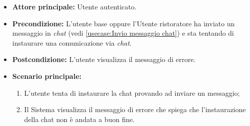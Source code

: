 \label{usecase:Errore instaurazione chat}
\begin{itemize}
    \item \textbf{Attore principale:} Utente autenticato. 

	\item \textbf{Precondizione:}
	L'utente base oppure l'Utente ristoratore ha inviato un messaggio in \textit{chat} (vedi \autoref{usecase:Invio messaggio chat}) e sta tentando di instaurare una comunicazione via \textit{chat}.

	\item \textbf{Postcondizione:}
	      L'utente visualizza il messaggio di errore.

	\item \textbf{Scenario principale:}
	      \begin{enumerate}
		      \item L'utente tenta di instaurare la chat provando ad inviare un messaggio;
		      \item Il Sistema visualizza il messaggio di errore che spiega che l'instaurazione della chat non è andata a buon fine.
	      \end{enumerate}
\end{itemize}